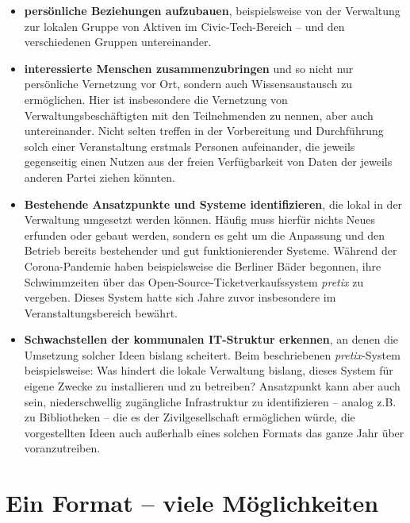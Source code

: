\begin{itemize}
	\item \textbf{persönliche Beziehungen aufzubauen}, \newline beispielsweise von der Verwaltung zur lokalen Gruppe von Aktiven im Civic-Tech-Bereich – und den verschiedenen Gruppen untereinander. 
	\vspace{0.5cm}
	\item \textbf{interessierte Menschen zusammenzubringen} \newline und so nicht nur persönliche Vernetzung vor Ort, sondern auch Wissensaustausch zu ermöglichen. Hier ist insbesondere die Vernetzung von Verwaltungsbeschäftigten mit den Teilnehmenden zu nennen, aber auch untereinander. Nicht selten treffen in der Vorbereitung und Durchführung solch einer Veranstaltung erstmals Personen aufeinander, die jeweils gegenseitig einen Nutzen aus der freien Verfügbarkeit von Daten der jeweils anderen Partei ziehen könnten.
	\vspace{0.5cm}
	\item \textbf{Bestehende Ansatzpunkte und Systeme identifizieren}, \newline die lokal in der Verwaltung umgesetzt werden können. Häufig muss hierfür nichts Neues erfunden oder gebaut werden, sondern es geht um die Anpassung und den Betrieb bereits bestehender und gut funktionierender Systeme. Während der Corona-Pandemie haben beispielsweise die Berliner Bäder begonnen, ihre Schwimmzeiten über das Open-Source-Ti\-cket\-verkauf\-ssystem \textit{pretix} zu vergeben. Dieses System hatte sich Jahre zuvor insbesondere im Veranstaltungsbereich bewährt.
	\vspace{0.5cm}
	\item \textbf{Schwachstellen der kommunalen IT-Struktur erkennen}, \newline an denen die Umsetzung solcher Ideen bislang scheitert. Beim beschriebenen \textit{pretix}-System beispielsweise: Was hindert die lokale Verwaltung bislang, dieses System für eigene Zwecke zu installieren und zu betreiben? Ansatzpunkt kann aber auch sein, niederschwellig zugängliche Infrastruktur zu identifizieren – analog z.B. zu Bibliotheken – die es der Zivilgesellschaft ermöglichen würde, die vorgestellten Ideen auch außerhalb eines solchen Formats das ganze Jahr über voranzutreiben.
\end{itemize}


\section*{Ein Format – viele Möglichkeiten}


